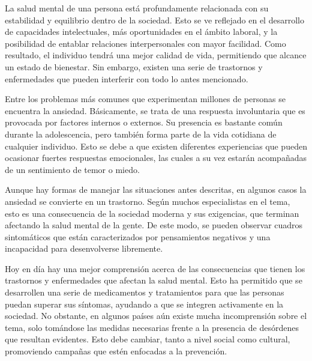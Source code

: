 La salud mental de una persona está profundamente relacionada con
su estabilidad y equilibrio dentro de la sociedad. Esto se ve reflejado
en el desarrollo de capacidades intelectuales, más oportunidades en el
ámbito laboral, y la posibilidad de entablar relaciones interpersonales
con mayor facilidad. Como resultado, el individuo tendrá una mejor
calidad de vida, permitiendo que alcance un estado de bienestar. Sin
embargo, existen una serie de trastornos y enfermedades que pueden
interferir con todo lo antes mencionado.


Entre los problemas más comunes que experimentan millones de 
personas se encuentra la ansiedad. Básicamente, se trata de una 
respuesta involuntaria que es provocada por factores internos o 
externos. Su presencia es bastante común durante la adolescencia, 
pero también forma parte de la vida cotidiana de cualquier 
individuo. Esto se debe a que existen diferentes experiencias que 
pueden ocasionar fuertes respuestas emocionales, las cuales a su vez 
estarán acompañadas de un sentimiento de temor o miedo.

Aunque hay formas de manejar las situaciones antes descritas, en 
algunos casos la ansiedad se convierte en un trastorno. Según muchos
 especialistas en el tema, esto es una consecuencia de la sociedad 
 moderna y sus exigencias, que terminan afectando la salud mental de
  la gente. De este modo, se pueden observar cuadros sintomáticos que 
  están caracterizados por pensamientos negativos y una incapacidad 
  para desenvolverse libremente.


  
Hoy en día hay una mejor comprensión acerca de las consecuencias 
que tienen los trastornos y enfermedades que afectan la salud mental. 
Esto ha permitido que se desarrollen una serie de medicamentos y 
tratamientos para que las personas puedan superar sus síntomas, 
ayudando a que se integren activamente en la sociedad. No obstante, 
en algunos países aún existe mucha incomprensión sobre el tema, solo 
tomándose las medidas necesarias frente a la presencia de desórdenes 
que resultan evidentes. Esto debe cambiar, tanto a nivel social como 
cultural, promoviendo campañas que estén enfocadas a la prevención.
